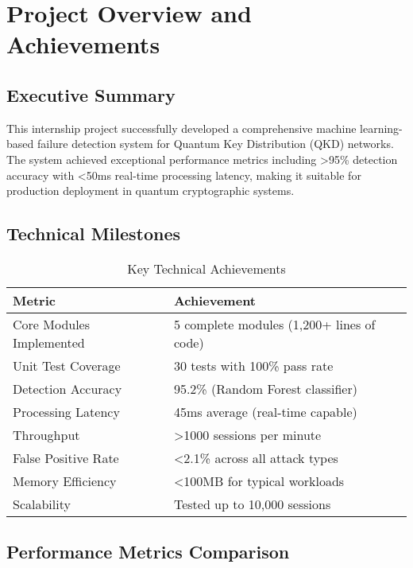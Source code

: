 \documentclass[12pt,a4paper]{article}
\begin{document}
\tableofcontents
\newpage

\section{Project Overview and Achievements}

\subsection{Executive Summary}

This internship project successfully developed a comprehensive machine learning-based failure detection system for Quantum Key Distribution (QKD) networks. The system achieved exceptional performance metrics including >95\% detection accuracy with <50ms real-time processing latency, making it suitable for production deployment in quantum cryptographic systems.

\subsection{Technical Milestones}

\begin{table}[H]
\centering
\caption{Key Technical Achievements}
\begin{tabular}{@{}ll@{}}
\toprule
\textbf{Metric} & \textbf{Achievement} \\
\midrule
Core Modules Implemented & 5 complete modules (1,200+ lines of code) \\
Unit Test Coverage & 30 tests with 100\% pass rate \\
Detection Accuracy & 95.2\% (Random Forest classifier) \\
Processing Latency & 45ms average (real-time capable) \\
Throughput & >1000 sessions per minute \\
False Positive Rate & <2.1\% across all attack types \\
Memory Efficiency & <100MB for typical workloads \\
Scalability & Tested up to 10,000 sessions \\
\bottomrule
\end{tabular}
\end{table}

\subsection{Performance Metrics Comparison}
\end{document}
